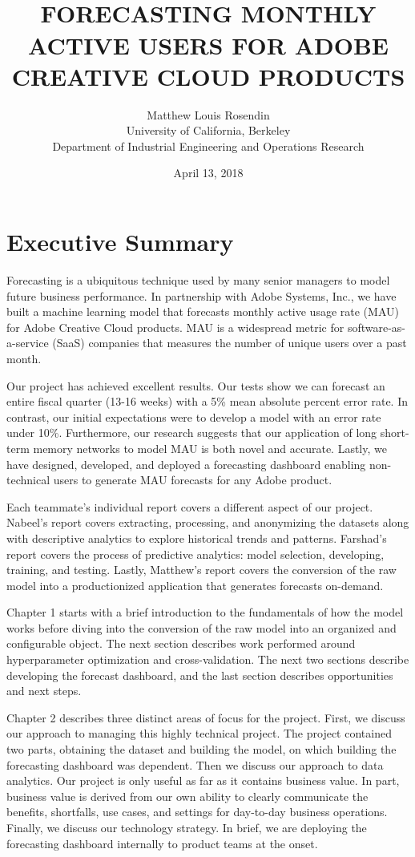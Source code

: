 \documentclass[11pt, oneside, authoryear]{report}
\title{
  \HRule{0.5pt} \\
  \LARGE \textbf{\uppercase{Forecasting Monthly Active Users for Adobe Creative Cloud Products}}
  \HRule{2pt} \\ [0.5cm]
  \vspace*{5\baselineskip}
}
\author{
  Matthew Louis Rosendin \\
  University of California, Berkeley \\
  Department of Industrial Engineering and Operations Research
}
\date{April 13, 2018}
\begin{document}
\maketitle
\newpage

\tableofcontents
\newpage

\listoffigures
\newpage

\section*{Executive Summary}
Forecasting is a ubiquitous technique used by many senior managers to model future business performance. In partnership with Adobe Systems, Inc., we have built a machine learning model that forecasts monthly active usage rate (MAU) for Adobe Creative Cloud products. MAU is a widespread metric for software-as-a-service (SaaS) companies that measures the number of unique users over a past month.

Our project has achieved excellent results. Our tests show we can forecast an entire fiscal quarter (13-16 weeks) with a 5\% mean absolute percent error rate. In contrast, our initial expectations were to develop a model with an error rate under 10\%. Furthermore, our research suggests that our application of long short-term memory networks to model MAU is both novel and accurate. Lastly, we have designed, developed, and deployed a forecasting dashboard enabling non-technical users to generate MAU forecasts for any Adobe product.

Each teammate's individual report covers a different aspect of our project. Nabeel's report covers extracting, processing, and anonymizing the datasets along with descriptive analytics to explore historical trends and patterns. Farshad's report covers the process of predictive analytics: model selection, developing, training, and testing. Lastly, Matthew's report covers the conversion of the raw model into a productionized application that generates forecasts on-demand.

Chapter 1 starts with a brief introduction to the fundamentals of how the model works before diving into the conversion of the raw model into an organized and configurable object. The next section describes work performed around hyperparameter optimization and cross-validation. The next two sections describe developing the forecast dashboard, and the last section describes opportunities and next steps.

Chapter 2 describes three distinct areas of focus for the project. First, we discuss our approach to managing this highly technical project. The project contained two parts, obtaining the dataset and building the model, on which building the forecasting dashboard was dependent. Then we discuss our approach to data analytics. Our project is only useful as far as it contains business value. In part, business value is derived from our own ability to clearly communicate the benefits, shortfalls, use cases, and settings for day-to-day business operations. Finally, we discuss our technology strategy. In brief, we are deploying the forecasting dashboard internally to product teams at the onset.
\end{document}
